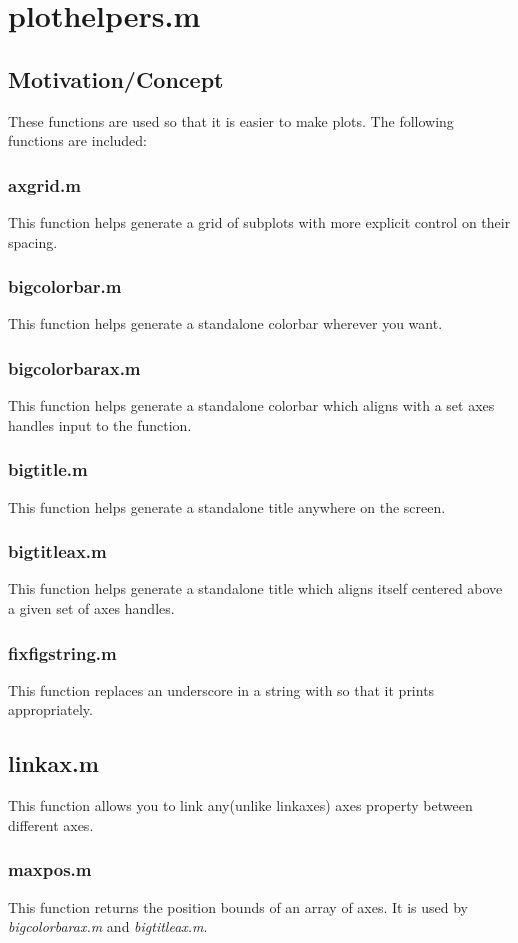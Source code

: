 \documentclass{article}
\begin{document}
	\section{plothelpers.m}
	\subsection{Motivation/Concept}
	These functions are used so that it is easier to make plots.  The following functions are included:
	\subsubsection{axgrid.m}
	This function helps generate a grid of subplots with more explicit control on their spacing.
	\subsubsection{bigcolorbar.m}
	This function helps generate a standalone colorbar wherever you want.
	\subsubsection{bigcolorbarax.m}
	This function helps generate a standalone colorbar which aligns with a set axes handles input to the function.
	\subsubsection{bigtitle.m}
	This function helps generate a standalone title anywhere on the screen.
	\subsubsection{bigtitleax.m}
	This function helps generate a standalone title which aligns itself centered above a given set of axes handles.
	\subsubsection{fixfigstring.m}
	This function replaces an underscore in a string with so that it prints appropriately.
	\subsection{linkax.m}
	This function allows you to link any(unlike linkaxes) axes property between different axes.
	\subsubsection{maxpos.m}
	This function returns the position bounds of an array of axes. It is used by \textit{bigcolorbarax.m} and \textit{bigtitleax.m}.
	\clearpage
\end{document}
